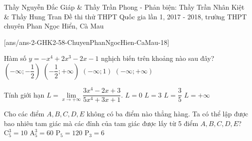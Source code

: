
\begin{name}
{Thầy Nguyễn Đắc Giáp \& Thầy Trần Phong - Phản biện: Thầy Trần Nhân Kiệt \& Thầy Hung Tran}
{Đề thi thử THPT Quốc gia lần 1, 2017 - 2018, trường THPT chuyên Phan Ngọc Hiển, Cà Mau}
\end{name}
\setcounter{ex}{0}
[ans/ans-2-GHK2-58-ChuyenPhanNgocHien-CaMau-18]

\begin{ex}%
	Hàm số $y=-x^4+2x^3-2x-1$ nghịch biến trên khoảng nào sau đây?
	\choice
	{$\left(-\infty;-\dfrac{1}{2}\right)$}
	{\True $\left(-\dfrac{1}{2};+\infty\right)$}
	{$\left(-\infty;1\right)$}
	{$\left(-\infty;+\infty\right)$}
\end{ex}
\begin{ex}%
	Tính giới hạn $L=\lim \limits_{x\to +\infty}\dfrac{3x^4-2x+3}{5x^4+3x+1}$.
	\choice
	{$L=0$}
	{$L=3$}
	{\True $L=\dfrac{3}{5}$}
	{$L=+\infty $}
\end{ex}
\begin{ex}%
	Cho các điểm $A,B,C,D,E$ không có ba điểm nào thẳng hàng. Ta có thể lập được bao nhiêu tam giác mà các đỉnh của tam giác được lấy từ 5 điểm $A,B,C,D,E$?
	\choice
	{\True $\mathrm{C}_5^3=10$}
	{$\mathrm{A}_5^3=60$}
	{$\mathrm{P}_5=120$}
	{$\mathrm{P}_3=6$}
\end{ex}
